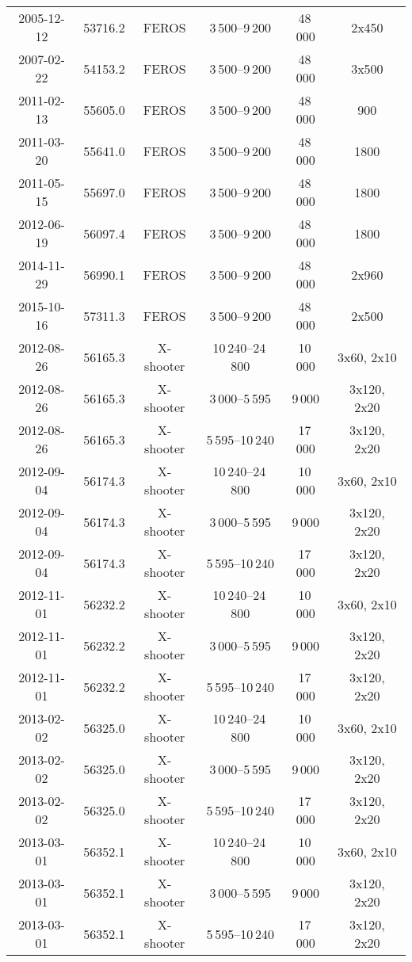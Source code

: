 \documentclass[structabstract]{aa}
\begin{document}
\begin{appendix}
\begin{longtable}{cccccc}
\hline
2005-12-12	&	53716.2	&	FEROS   	&	3\,500--9\,200	& 48\,000 &	2x450	\\
2007-02-22	&	54153.2	&	FEROS   	&	3\,500--9\,200	& 48\,000 &	3x500	\\
2011-02-13	& 55605.0	&	FEROS   	&	3\,500--9\,200	& 48\,000 &	900	\\
2011-03-20	& 55641.0	&	FEROS   	&	3\,500--9\,200	& 48\,000 &	1800	\\
2011-05-15	&	55697.0	&	FEROS   	&	3\,500--9\,200	& 48\,000 &	1800	\\
2012-06-19	&	56097.4	&	FEROS   	&	3\,500--9\,200	& 48\,000 &	1800	\\
2014-11-29	&	56990.1	&	FEROS   	&	3\,500--9\,200	& 48\,000 &	2x960	\\
2015-10-16	&	57311.3	&	FEROS   	&	3\,500--9\,200	& 48\,000 &	2x500	\\
\hline
2012-08-26	&	56165.3	&	X-shooter\tablefootmark{2}	&	10\,240--24\,800	& 10\,000 &	3x60, 2x10	\\
2012-08-26 	&	56165.3	&	X-shooter	&	3\,000--5\,595	& 9\,000 &	3x120, 2x20	\\
2012-08-26 	&	56165.3	&	X-shooter	&	5\,595--10\,240	& 17\,000 &	3x120, 2x20	\\

2012-09-04	&	56174.3	&	X-shooter	&	10\,240--24\,800	& 10\,000 &	3x60, 2x10	\\
2012-09-04 	&	56174.3	&	X-shooter	&	3\,000--5\,595	& 9\,000 &	3x120, 2x20	\\
2012-09-04 	&	56174.3	&	X-shooter	&	5\,595--10\,240	& 17\,000 &	3x120, 2x20	\\

2012-11-01	&	56232.2	&	X-shooter	&	10\,240--24\,800	& 10\,000 &	3x60, 2x10	\\
2012-11-01 	&	56232.2	&	X-shooter	&	3\,000--5\,595	& 9\,000 &	3x120, 2x20	\\
2012-11-01 	&	56232.2	&	X-shooter	&	5\,595--10\,240	& 17\,000 &	3x120, 2x20	\\

2013-02-02	&	56325.0	&	X-shooter	&	10\,240--24\,800	& 10\,000 &	3x60, 2x10	\\
2013-02-02 	&	56325.0	&	X-shooter	&	3\,000--5\,595	& 9\,000 &	3x120, 2x20	\\
2013-02-02 	&	56325.0	&	X-shooter	&	5\,595--10\,240	& 17\,000 &	3x120, 2x20	\\

2013-03-01	&	56352.1	&	X-shooter	&	10\,240--24\,800	& 10\,000 &	3x60, 2x10	\\
2013-03-01 	&	56352.1	&	X-shooter	&	3\,000--5\,595	& 9\,000 &	3x120, 2x20	\\
2013-03-01 	&	56352.1	&	X-shooter	&	5\,595--10\,240	& 17\,000 &	3x120, 2x20	\\


\end{longtable}
\end{appendix}
\end{document}
